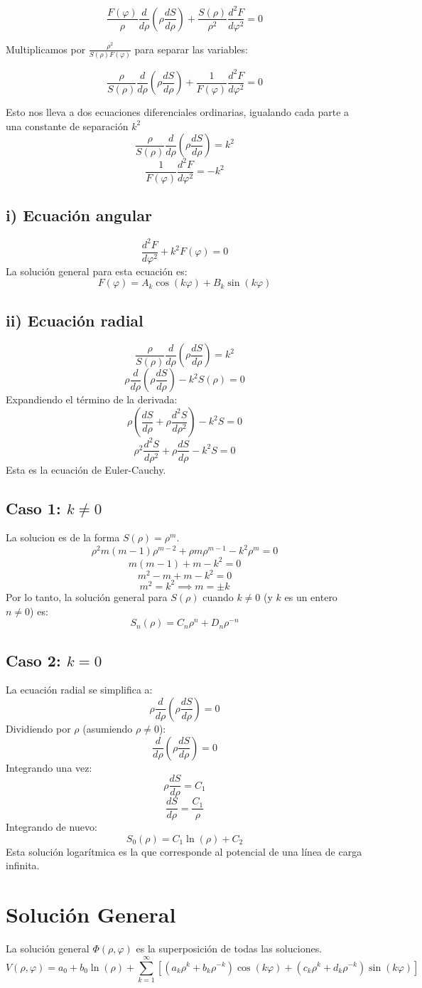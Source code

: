 \documentclass[12pt]{article}
\begin{document}
$$ \frac{F(\varphi)}{\rho} \frac{d}{d \rho} \left( \rho \frac{d S}{d \rho} \right) + \frac{S(\rho)}{\rho^2} \frac{d^2 F}{d \varphi^2} = 0 $$

Multiplicamos por $\frac{\rho^2}{S(\rho)F(\varphi)}$ para separar las variables:

$$ \frac{\rho}{S(\rho)} \frac{d}{d \rho} \left( \rho \frac{d S}{d \rho} \right) + \frac{1}{F(\varphi)} \frac{d^2 F}{d \varphi^2} = 0 $$

Esto nos lleva a dos ecuaciones diferenciales ordinarias, igualando cada parte a una constante de separación $k^2$
$$ \frac{\rho}{S(\rho)} \frac{d}{d \rho} \left( \rho \frac{d S}{d \rho} \right) = k^2 $$
$$ \frac{1}{F(\varphi)} \frac{d^2 F}{d \varphi^2} = -k^2 $$

\subsection*{i) Ecuación angular}
$$ \frac{d^2 F}{d \varphi^2} + k^2 F(\varphi) = 0 $$
La solución general para esta ecuación es:
$$ F(\varphi) = A_k \cos(k\varphi) + B_k \sin(k\varphi) $$

\subsection*{ii) Ecuación radial}
$$ \frac{\rho}{S(\rho)} \frac{d}{d \rho} \left( \rho \frac{d S}{d \rho} \right) = k^2 $$
$$ \rho \frac{d}{d \rho} \left( \rho \frac{d S}{d \rho} \right) - k^2 S(\rho) = 0 $$
Expandiendo el término de la derivada:
$$ \rho \left( \frac{dS}{d\rho} + \rho \frac{d^2S}{d\rho^2} \right) - k^2 S = 0 $$
$$ \rho^2 \frac{d^2S}{d\rho^2} + \rho \frac{dS}{d\rho} - k^2 S = 0 $$
Esta es la ecuación de Euler-Cauchy.

\subsection*{Caso 1: $k \neq 0$}
La solucion es de la forma $S(\rho) = \rho^m$. 
$$ \rho^2 m(m-1)\rho^{m-2} + \rho m\rho^{m-1} - k^2 \rho^m = 0 $$
$$ m(m-1) + m - k^2 = 0 $$
$$ m^2 - m + m - k^2 = 0 $$
$$ m^2 = k^2 \implies m = \pm k $$
Por lo tanto, la solución general para $S(\rho)$ cuando $k \neq 0$ (y $k$ es un entero $n \neq 0$) es:
$$ S_n(\rho) = C_n \rho^n + D_n \rho^{-n} $$

\subsection*{Caso 2: $k = 0$}
La ecuación radial se simplifica a:
$$ \rho \frac{d}{d \rho} \left( \rho \frac{d S}{d \rho} \right) = 0 $$
Dividiendo por $\rho$ (asumiendo $\rho \neq 0$):
$$ \frac{d}{d \rho} \left( \rho \frac{d S}{d \rho} \right) = 0 $$
Integrando una vez:
$$ \rho \frac{d S}{d \rho} = C_1 $$
$$ \frac{d S}{d \rho} = \frac{C_1}{\rho} $$
Integrando de nuevo:
$$ S_0(\rho) = C_1 \ln(\rho) + C_2 $$
Esta solución logarítmica es la que corresponde al potencial de una línea de carga infinita.

\section*{Solución General}

La solución general $\Phi(\rho, \varphi)$ es la superposición de todas las soluciones. 
$$ V(\rho, \varphi) = a_0 + b_0 \ln(\rho) + \sum_{k=1}^{\infty} \left[ (a_k \rho^k + b_k \rho^{-k})\cos(k\varphi) + (c_k \rho^k + d_k \rho^{-k})\sin(k\varphi) \right] $$
\end{document}
